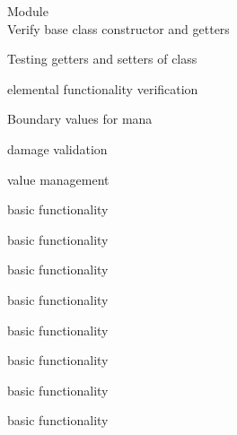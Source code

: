 \begin{DoxyRefList}
\item[Module \doxylink{group__GCI}{GCI} ]\hfill \\
\label{test__test000001}%
%
Verify base  class constructor and getters  



\label{test__test000002}%
%
Testing getters and setters of  class  



\label{test__test000003}%
%
 elemental functionality verification  



\label{test__test000004}%
%
Boundary values for  mana  



\label{test__test000005}%
%
 damage validation  



\label{test__test000007}%
%
 value management  



\label{test__test000009}%
%
 basic functionality  



\label{test__test000011}%
%
 basic functionality  



\label{test__test000013}%
%
 basic functionality  



\label{test__test000015}%
%
 basic functionality  



\label{test__test000017}%
%
 basic functionality  



\label{test__test000019}%
%
 basic functionality  



\label{test__test000021}%
%
 basic functionality  



\label{test__test000023}%
%
 basic functionality  


\end{DoxyRefList}